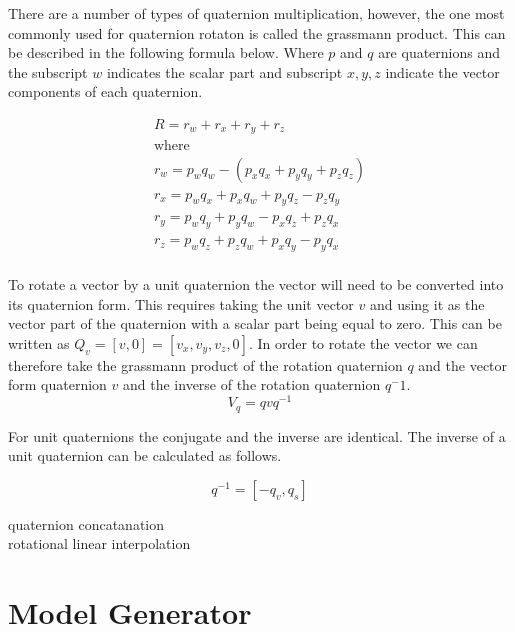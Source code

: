 There are a number of types of quaternion multiplication, however, the one most commonly used for quaternion rotaton is called the grassmann product. This can be described in the following formula below. Where $p$ and $q$ are quaternions and the subscript $w$ indicates the scalar part and subscript $x, y, z$ indicate the vector components of each quaternion.

\begin{equation}
\begin{aligned}
R = r_w + r_x + r_y + r_z\\
\text{where}\\
r_w = p_w q_w - (p_x q_x + p_y q_y + p_z q_z)\\
r_x = p_w q_x + p_x q_w + p_y q_z - p_z q_y\\
r_y = p_w q_y + p_y q_w - p_x q_z + p_z q_x\\
r_z = p_w q_z + p_z q_w + p_x q_y - p_y q_x\\
\end{aligned}
\end{equation}

To rotate a vector by a unit quaternion the vector will need to be converted into its quaternion form. This requires taking the unit vector $v$ and using it as the vector part of the quaternion with a scalar part being equal to zero. This can be written as $Q_v = [v, 0] = [v_x, v_y, v_z, 0]$. In order to rotate the vector we can therefore take the grassmann product of the rotation quaternion $q$ and the vector form quaternion $v$ and the inverse of the rotation quaternion $q^-1$. \\

\begin{equation}
	V_q = qvq^{-1}
\end{equation}

\noindent
For unit quaternions the conjugate and the inverse are identical. The inverse of a unit quaternion can be calculated as follows. 

\begin{equation}
	q^{-1} = [-q_v, q_s]
\end{equation}


quaternion concatanation\\

rotational linear interpolation\\


\section{Model Generator}

